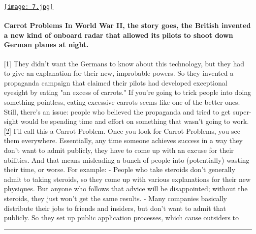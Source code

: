 \documentclass[10pt,a4paper]{article}
\begin{document}
\begin{minipage}[t]{0.80\linewidth}
\vspace{0pt}
\begin{multicols}{2}

    \href{https://www.atvbt.com/the-carrot-problem/?utm\_source=hackernewsletter\&utm\_medium=email\&utm\_term=fav}{
        \texttt{[image: 7.jpg]}
    }
  
\paragraph{Carrot Problems
In World War II, the story goes, the British invented a new kind of onboard radar that allowed its pilots to shoot down German planes at night.}
[1]
They didn't want the Germans to know about this technology, but they had to give an explanation for their new, improbable powers.
So they invented a propaganda campaign that claimed their pilots had developed exceptional eyesight by eating "an excess of carrots."
If you're going to trick people into doing something pointless, eating excessive carrots seems like one of the better ones. Still, there's an issue: people who believed the propaganda and tried to get super-sight would be spending time and effort on something that wasn't going to work.[2]
I'll call this a Carrot Problem.
Once you look for Carrot Problems, you see them everywhere. Essentially, any time someone achieves success in a way they don't want to admit publicly, they have to come up with an excuse for their abilities. And that means misleading a bunch of people into (potentially) wasting their time, or worse.
For example:
- People who take steroids don't generally admit to taking steroids, so they come up with various explanations for their new physiques. But anyone who follows that advice will be disappointed; without the steroids, they just won't get the same results.
- Many companies basically distribute their jobs to friends and insiders, but don't want to admit that publicly. So they set up public application processes, which cause outsiders to 

\end{multicols}
\end{minipage}
\par\medskip
\noindent\textcolor{red}{\rule{\linewidth}{0.2mm}}
\end{document}
